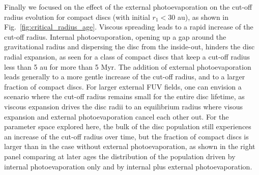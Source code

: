 \documentclass[fleqn,usenatbib]{mnras}
\begin{document}
Finally we focused on the effect of the external photoevaporation on the cut-off radius evolution for compact discs (with initial $r_1 < 30$ au), as shown in Fig.~\ref{fig:critical_radius_age}.
Viscous spreading leads to a rapid increase of the cut-off radius.
Internal photoevaporation, opening up a gap around the gravitational radius and dispersing the disc from the inside-out, hinders the disc radial expansion, as seen for a class of compact discs that keep a cut-off radius less than 5 au for more than 5 Myr.
The addition of external photoevaporation leads generally to a more gentle increase of the cut-off radius, and to a larger fraction of compact discs.
For larger external FUV fields, one can envision a scenario where the cut-off radius remains small for the entire disc lifetime, as viscous expansion drives the disc radii to an equilibrium radius where visous expansion and external photoevaporation cancel each other out.
For the parameter space explored here, the bulk of the disc population still experiences an increase of the cut-off radius over time, but the fraction of compact discs is larger than in the case without external photoevaporation, as shown in the right panel comparing at later ages the distribution of the population driven by internal photoevaporation only and by internal plus external photoevaporation.
\end{document}
